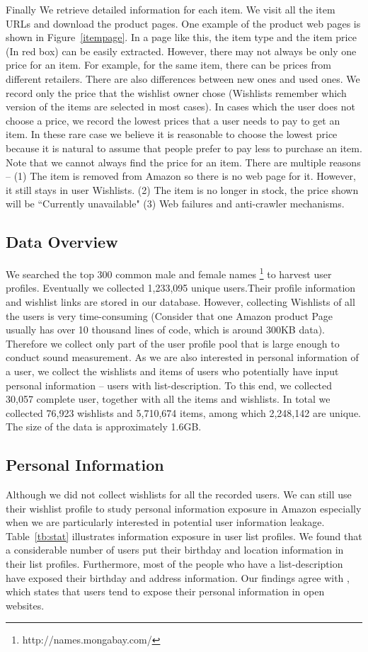 Finally We retrieve detailed information for each item. We visit all the item URLs and download the product pages. One example of the product web pages is shown in Figure~\ref{itempage}. In a page like this, the item type and the item price (In red box) can be easily extracted. However, there may not always be only one price for an item. For example, for the same item, there can be prices from different retailers. There are also differences between new ones and used ones. We record only the price that the wishlist owner chose (Wishlists remember which version of the items are selected in most cases). In cases which the user does not choose a price, we record the lowest prices that a user needs to pay to get an item. In these rare case we believe it is reasonable to choose the lowest price because it is natural to assume that people prefer to pay less to purchase an item. Note that we cannot always find the price for an item. There are multiple reasons -- (1) The item is removed from Amazon so there is no web page for it. However, it still stays in user Wishlists. (2) The item is no longer in stock, the price shown will be ``Currently unavailable" (3) Web failures and anti-crawler mechanisms.

\subsection{Data Overview}
We searched the top 300 common male and female names \footnote{http://names.mongabay.com/} to harvest user profiles. Eventually we collected 1,233,095 unique users.Their profile information and wishlist links are stored in our database. However, collecting Wishlists of all the users is very time-consuming (Consider that one Amazon product Page usually has over 10 thousand lines of code, which is around 300KB data). Therefore we collect only part of the user profile pool that is large enough to conduct sound measurement. As we are also interested in personal information of a user, we collect the wishlists and items of users who potentially have input personal information -- users with list-description. To this end, we collected 30,057 complete user, together with all the items and wishlists. In total we collected 76,923 wishlists and 5,710,674 items, among which 2,248,142 are unique. The size of the data is approximately 1.6GB. 


\subsection{Personal Information}
Although we did not collect wishlists for all the recorded users. We can still use their wishlist profile to study personal information exposure in Amazon especially when we are particularly interested in potential user information leakage. Table~\ref{tb:stat} illustrates information exposure in user list profiles. We found that a considerable number of users put their birthday and location information in their list profiles. Furthermore, most of the people who have a list-description have exposed their birthday and address information. Our findings agree with \cite{frankowski2006you}, which states that users tend to expose their personal information in open websites. 


